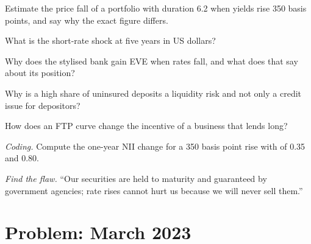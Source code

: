 \begin{exercise}[$\star$]\label{exo:rc:liquidity-and-funding-risk-bank-treasury:2}
Estimate the price fall of a portfolio with duration 6.2 when yields rise 350 basis points, and
say why the exact figure differs.
\end{exercise}

\begin{exercise}[$\star$]\label{exo:rc:liquidity-and-funding-risk-bank-treasury:3}
What is the short-rate shock at five years in US dollars?
\end{exercise}

\begin{exercise}[$\star\star$]\label{exo:rc:liquidity-and-funding-risk-bank-treasury:4}
Why does the stylised bank gain EVE when rates fall, and what does that say about its position?
\end{exercise}

\begin{exercise}[$\star\star$]\label{exo:rc:liquidity-and-funding-risk-bank-treasury:5}
Why is a high share of uninsured deposits a liquidity risk and not only a credit issue for depositors?
\end{exercise}

\begin{exercise}[$\star\star$]\label{exo:rc:liquidity-and-funding-risk-bank-treasury:6}
How does an FTP curve change the incentive of a business that lends long?
\end{exercise}

\begin{exercise}[$\star\star\star$]\label{exo:rc:liquidity-and-funding-risk-bank-treasury:7}
\emph{Coding.} Compute the one-year NII change for a 350 basis point rise with  of 0.35
and 0.80.
\end{exercise}

\begin{exercise}[$\star\star\star$]\label{exo:rc:liquidity-and-funding-risk-bank-treasury:8}
\emph{Find the flaw.} ``Our securities are held to maturity and guaranteed by government agencies;
rate rises cannot hurt us because we will never sell them.''
\end{exercise}

\section{Problem: March 2023}

